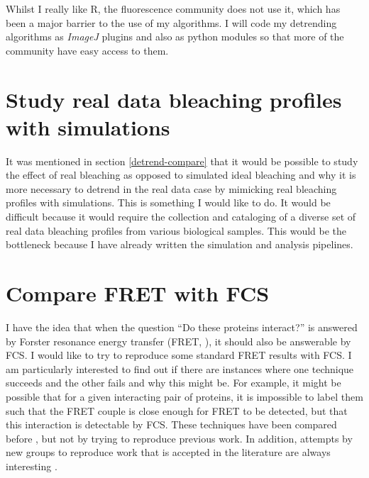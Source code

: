 \documentclass[12pt,]{book}
\theoremstyle{definition}
\theoremstyle{definition}
\theoremstyle{definition}
\theoremstyle{remark}
\begin{document}
Whilst I really like R, the fluorescence community does not use it,
which has been a major barrier to the use of my algorithms. I will code
my detrending algorithms as \emph{ImageJ} plugins and also as python
modules so that more of the community have easy access to them.

\section{Study real data bleaching profiles with
simulations}\label{mimic}

It was mentioned in section \ref{detrend-compare} that it would be
possible to study the effect of real bleaching as opposed to simulated
ideal bleaching and why it is more necessary to detrend in the real data
case by mimicking real bleaching profiles with simulations. This is
something I would like to do. It would be difficult because it would
require the collection and cataloging of a diverse set of real data
bleaching profiles from various biological samples. This would be the
bottleneck because I have already written the simulation and analysis
pipelines.

\section{Compare FRET with FCS}\label{compare-fret-with-fcs}

I have the idea that when the question ``Do these proteins interact?''
is answered by Forster resonance energy transfer (FRET, \citet{Frster}),
it should also be answerable by FCS. I would like to try to reproduce
some standard FRET results with FCS. I am particularly interested to
find out if there are instances where one technique succeeds and the
other fails and why this might be. For example, it might be possible
that for a given interacting pair of proteins, it is impossible to label
them such that the FRET couple is close enough for FRET to be detected,
but that this interaction is detectable by FCS. These techniques have
been compared before \citep{Sahoo}, but not by trying to reproduce
previous work. In addition, attempts by new groups to reproduce work
that is accepted in the literature are always interesting
\citep{Baker2016}.


\end{document}
